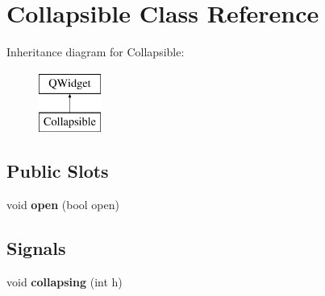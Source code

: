 \hypertarget{class_collapsible}{\section{Collapsible Class Reference}
\label{class_collapsible}
}
Inheritance diagram for Collapsible\-:\begin{figure}[H]
\begin{center}
\leavevmode
\includegraphics[height=2.000000cm]{class_collapsible}
\end{center}
\end{figure}
\subsection*{Public Slots}
\begin{DoxyCompactItemize}
\item 
\hypertarget{class_collapsible_a7422a1c31a8de4df2439cca4724918e9}{void {\bfseries open} (bool open)}\label{class_collapsible_a7422a1c31a8de4df2439cca4724918e9}

\end{DoxyCompactItemize}
\subsection*{Signals}
\begin{DoxyCompactItemize}
\item 
\hypertarget{class_collapsible_ab271d9e68c09f8fcd33dc8b02658967b}{void {\bfseries collapsing} (int h)}\label{class_collapsible_ab271d9e68c09f8fcd33dc8b02658967b}

\end{DoxyCompactItemize}
